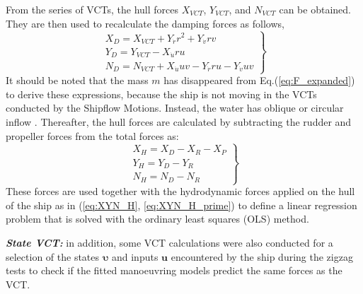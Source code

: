 From the series of VCTs, the hull forces $X_{VCT}$, $Y_{VCT}$, and $N_{VCT}$ can be obtained. They are then used to recalculate the damping forces as follows,
\begin{equation}
    \label{eq:X_D}
    \left.\begin{aligned}
    X_{D} = X_{VCT} + Y_{\dot{r}} r^{2} + Y_{\dot{v}} r v \\
    Y_{D} =  Y_{VCT} - X_{\dot{u}} r u\\
    N_{D} = N_{VCT} + X_{\dot{u}} u v - Y_{\dot{r}} r u - Y_{\dot{v}} u v
    \end{aligned}\right\}
\end{equation}
It should be noted that the mass $m$ has disappeared from Eq.(\ref{eq:F_expanded}) to derive these expressions, because the ship is not moving in the VCTs conducted by the Shipflow Motions. Instead, the water has oblique or circular inflow \citep{roychoudhuryCFDSimulationsSteady2017}.
Thereafter, the hull forces are calculated by subtracting the rudder and propeller forces from the total forces as:
\begin{equation}
    \label{eq:X_H_VCT}
    \left.\begin{aligned}
    X_H = X_D - X_R - X_P \\
    Y_H = Y_D - Y_R \\
    N_H = N_D - N_R
    \end{aligned}\right\}
\end{equation}
These forces are used together with the hydrodynamic forces applied on the hull of the ship as in (\autoref{eq:XYN_H}, \autoref{eq:XYN_H_prime}) to define a linear regression problem that is solved with the ordinary least squares (OLS) method.

\textbf{\textit{State VCT:}} in addition, some VCT calculations were also conducted for a selection of the states $\pmb{\bm{\upsilon}}$ and inputs $\mathbf{u}$ encountered by the ship during the zigzag tests to check if the fitted manoeuvring models predict the same forces as the VCT.